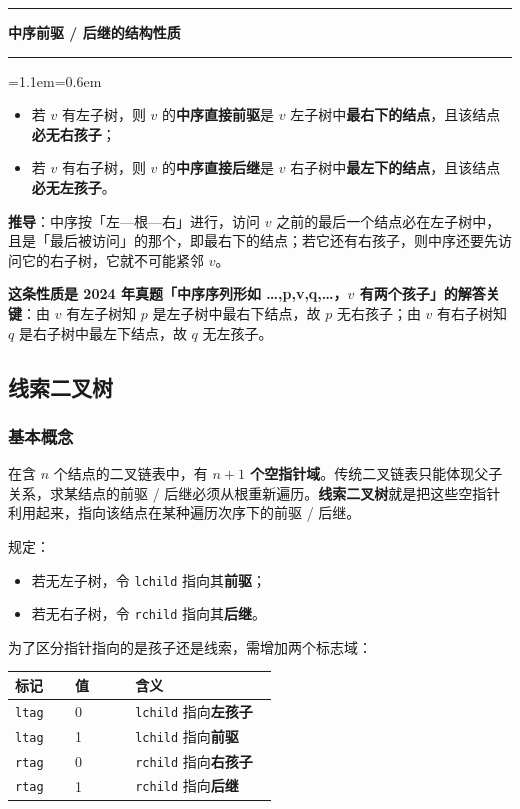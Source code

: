\documentclass[11pt,openany,UTF8]{ctexbook}
\newcommand{\callouthead}[2]{%
  \par\addvspace{7pt}\noindent
  {\color{#1}\rule[-0.15em]{3pt}{1.05em}}\hspace{0.5em}%
  {\bfseries\color{#1}#2}\par\nobreak\vspace{-0.35em}%
  {\color{rulesep}\hrule height 0.4pt}\nobreak\vspace{0.45em}%
  \begingroup\small\setlength{\parindent}{0pt}%
  \leftskip=1.1em\rightskip=0.6em\noindent\ignorespaces}
\newcommand{\calloutend}{\par\endgroup\addvspace{7pt}}
\newenvironment{callkey}[1]{\callouthead{keybar}{#1}}{\calloutend}
\begin{document}
\begin{callkey}{中序前驱 / 后继的结构性质}
\begin{itemize}
\item 若 $v$ 有左子树，则 $v$ 的\textbf{中序直接前驱}是 $v$ 左子树中\textbf{最右下的结点}，且该结点\textbf{必无右孩子}；
\item 若 $v$ 有右子树，则 $v$ 的\textbf{中序直接后继}是 $v$ 右子树中\textbf{最左下的结点}，且该结点\textbf{必无左孩子}。
\end{itemize}
\textbf{推导}：中序按「左—根—右」进行，访问 $v$ 之前的最后一个结点必在左子树中，且是「最后被访问」的那个，即最右下的结点；若它还有右孩子，则中序还要先访问它的右子树，它就不可能紧邻 $v$。

\textbf{这条性质是 2024 年真题「中序序列形如 …,p,v,q,…，$v$ 有两个孩子」的解答关键}：由 $v$ 有左子树知 $p$ 是左子树中最右下结点，故 $p$ 无右孩子；由 $v$ 有右子树知 $q$ 是右子树中最左下结点，故 $q$ 无左孩子。

\end{callkey}

\subsection{线索二叉树}

\subsubsection{基本概念}

在含 $n$ 个结点的二叉链表中，有 \textbf{$n+1$ 个空指针域}。传统二叉链表只能体现父子关系，求某结点的前驱 / 后继必须从根重新遍历。\textbf{线索二叉树}就是把这些空指针利用起来，指向该结点在某种遍历次序下的前驱 / 后继。

规定：

\begin{itemize}
\item 若无左子树，令 \texttt{lchild} 指向其\textbf{前驱}；
\item 若无右子树，令 \texttt{rchild} 指向其\textbf{后继}。
\end{itemize}
为了区分指针指向的是孩子还是线索，需增加两个标志域：

\begingroup\small\setlength{\tabcolsep}{4.0pt}
\begin{longtable}{@{}L{0.2125\linewidth}L{0.2125\linewidth}L{0.5035\linewidth}@{}}
\toprule
\textbf{标记} & \textbf{值} & \textbf{含义} \\
\midrule
\endhead
\texttt{ltag} & 0 & \texttt{lchild} 指向\textbf{左孩子} \\
\texttt{ltag} & 1 & \texttt{lchild} 指向\textbf{前驱} \\
\texttt{rtag} & 0 & \texttt{rchild} 指向\textbf{右孩子} \\
\texttt{rtag} & 1 & \texttt{rchild} 指向\textbf{后继} \\
\bottomrule
\end{longtable}
\endgroup
\end{document}
